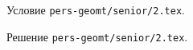 \problem
Условие \texttt{pers-geomt/senior/2.tex}.

\solution Решение \texttt{pers-geomt/senior/2.tex}.
\endproblem
